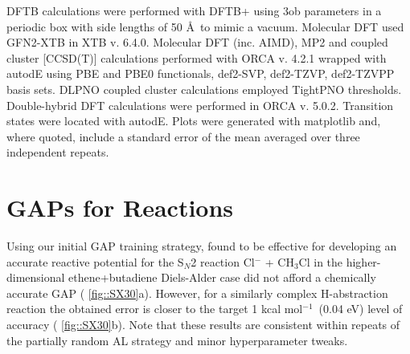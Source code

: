 \documentclass[11pt]{article}
\numberwithin{equation}{subsection}
\newcommand{\kcal}{kcal mol$^{-1}$}
\begin{document}
DFTB calculations were performed with DFTB+\cite{Hourahine2020} using 3ob\cite{Gaus2014} parameters in a periodic box with side lengths of 50 \AA~to mimic a vacuum. Molecular DFT used GFN2-XTB\cite{Bannwarth2019} in XTB v. 6.4.0. Molecular DFT (inc. AIMD), MP2 and coupled cluster [CCSD(T)] calculations performed with ORCA\cite{Neese2017, Neese2020} v. 4.2.1 wrapped with autodE\cite{autodE} using PBE\cite{Perdew1996} and PBE0\cite{Adamo1999} functionals, def2-SVP, def2-TZVP, def2-TZVPP basis sets.\cite{Weigend2005} DLPNO coupled cluster calculations employed TightPNO thresholds.\cite{Yang2018} Double-hybrid DFT calculations were performed in ORCA v. 5.0.2. Transition states were located with autodE. Plots were generated with matplotlib and, where quoted, include a standard error of the mean averaged over three independent repeats.

\clearpage

\section{GAPs for Reactions} \label{section::SI_gap_reactions}

Using our initial GAP training strategy,\cite{gaptrain2021} found to be effective for developing an accurate reactive potential for the S${}_N$2 reaction Cl${}^{-}$ + CH${}_3$Cl in the higher-dimensional ethene+butadiene Diels-Alder case did not afford a chemically accurate GAP (\figurename{ \ref{fig::SX30}a}). However, for a similarly complex H-abstraction reaction the obtained error is closer to the target 1 \kcal~(0.04 eV) level of accuracy (\figurename{ \ref{fig::SX30}b}). Note that these results are consistent within repeats of the partially random AL strategy and minor hyperparameter tweaks.
\end{document}
